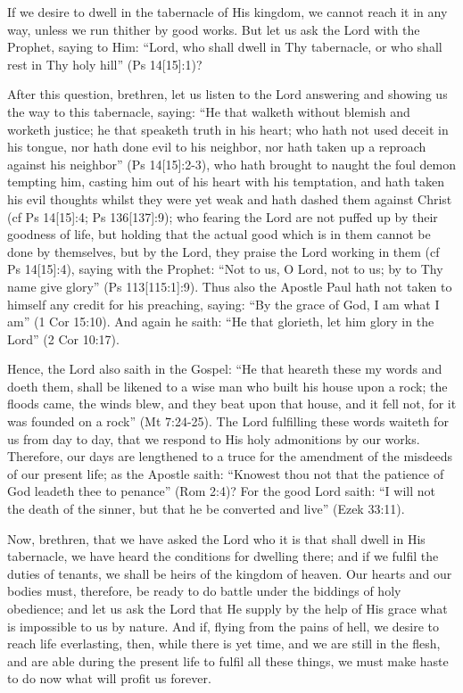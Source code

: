 If we desire to dwell in the tabernacle of His kingdom, we cannot reach it in any way, unless we run thither by good works. But let us ask the Lord with the Prophet, saying to Him: ``Lord, who shall dwell in Thy tabernacle, or who shall rest in Thy holy hill'' (Ps 14[15]:1)?

After this question, brethren, let us listen to the Lord answering and showing us the way to this tabernacle, saying: ``He that walketh without blemish and worketh justice; he that speaketh truth in his heart; who hath not used deceit in his tongue, nor hath done evil to his neighbor, nor hath taken up a reproach against his neighbor'' (Ps 14[15]:2-3), who hath brought to naught the foul demon tempting him, casting him out of his heart with his temptation, and hath taken his evil thoughts whilst they were yet weak and hath dashed them against Christ (cf Ps 14[15]:4; Ps 136[137]:9); who fearing the Lord are not puffed up by their goodness of life, but holding that the actual good which is in them cannot be done by themselves, but by the Lord, they praise the Lord working in them (cf Ps 14[15]:4), saying with the Prophet: ``Not to us, O Lord, not to us; by to Thy name give glory'' (Ps 113[115:1]:9). Thus also the Apostle Paul hath not taken to himself any credit for his preaching, saying: ``By the grace of God, I am what I am'' (1 Cor 15:10). And again he saith: ``He that glorieth, let him glory in the Lord'' (2 Cor 10:17).

Hence, the Lord also saith in the Gospel: ``He that heareth these my words and doeth them, shall be likened to a wise man who built his house upon a rock; the floods came, the winds blew, and they beat upon that house, and it fell not, for it was founded on a rock'' (Mt 7:24-25). The Lord fulfilling these words waiteth for us from day to day, that we respond to His holy admonitions by our works. Therefore, our days are lengthened to a truce for the amendment of the misdeeds of our present life; as the Apostle saith: ``Knowest thou not that the patience of God leadeth thee to penance'' (Rom 2:4)? For the good Lord saith: ``I will not the death of the sinner, but that he be converted and live'' (Ezek 33:11).

Now, brethren, that we have asked the Lord who it is that shall dwell in His tabernacle, we have heard the conditions for dwelling there; and if we fulfil the duties of tenants, we shall be heirs of the kingdom of heaven. Our hearts and our bodies must, therefore, be ready to do battle under the biddings of holy obedience; and let us ask the Lord that He supply by the help of His grace what is impossible to us by nature. And if, flying from the pains of hell, we desire to reach life everlasting, then, while there is yet time, and we are still in the flesh, and are able during the present life to fulfil all these things, we must make haste to do now what will profit us forever.

